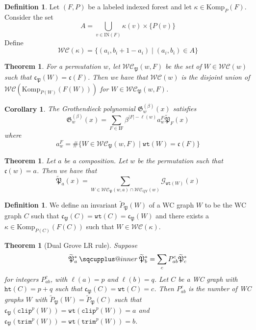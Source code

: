 \documentclass{amsart}
\makeatletter
\newcommand{\sqcupplus@inner}[2]{%
  \vcenter{\hbox{\ooalign{%
    \hfil$\m@th#1\sqcup$\hfil\cr
    \hfil\raisebox{0.15ex}{$\m@th#1\scriptscriptstyle+$}\hfil\cr
  }}}%
}
\newcommand{\sqcupplus}{\mathbin{\mathpalette\sqcupplus@inner\relax}}
\newtheorem{corollary}[lemma]{Corollary}
\newtheorem{theorem}[lemma]{Theorem}
\newcommand{\grove}{\widetilde{\mathfrak{P}}}
\theoremstyle{definition}
\newtheorem{definition}[lemma]{Definition}
\theoremstyle{remark}
\numberwithin{equation}{subsection}
\newcommand{\wtt}{\mathtt{wt}}
\newcommand{\trm}{\mathtt{trim}}
\newcommand{\hr}{\mathtt{ht}}
\newcommand{\clp}{\mathtt{clip}}
\newcommand{\WC}{\mathcal{WC}}
\newcommand{\code}{\mathfrak{c}}
\newcommand{\forest}{\mathfrak{P}}
\makeatother
\begin{document}
\begin{definition}
Let $(F,P)$ be a labeled indexed forest and let $\kappa\in\mathrm{Komp}_P(F)$. Consider the set 
$$A =\bigcup_{v\in\mathrm{IN}(F)}\kappa(v)\times \{P(v)\}$$
Define
$$\WC(\kappa) = \{(a_i, b_i + 1 - a_i)\mid (a_i, b_i)\in A\}$$
\end{definition}

\begin{theorem}
For a permutation $w$, let $\WC_\forest(w, F)$ be the set of $W\in\WC(w)$ such that $\code_\forest(W) = \code(F)$. Then we have that $\WC(w)$ is the disjoint union of $\WC(\mathrm{Komp}_{P(W)}(F(W)))$ for $W\in \WC_\forest(w, F)$.
\end{theorem}

\begin{corollary}
The Grothendieck polynomial $\mathfrak{G}^{(\beta)}_w(x)$ satisfies
$$\mathfrak{G}^{(\beta)}_w(x)=\sum_{F\in \mathrm{IF}} \beta^{|F|-\ell(w)}a_w^F\grove_F(x)$$
where 
$$a_w^F = \#\{W\in \WC_\forest(w, F)\mid \wtt(W) = \code(F)\}$$
\end{corollary}

\begin{theorem}
Let $a$ be a composition. Let $w$ be the permutation such that $\code(w) = a$. Then we have that
$$\grove_a(x) = \sum_{W\in\WC_\forest(w, a)\cap \WC_{\mathrm{QY}}(w)} \mathcal{G}_{\wtt(W)}(x)$$
\end{theorem}

\begin{definition}
We define an invariant $\widetilde{P}_\forest(W)$ of a WC graph $W$ to be the WC graph $C$ such that $\code_\forest(C) = \wtt(C) = \code_\forest(W)$ and there exists a $\kappa\in \mathrm{Komp}_{P(C)}(F(C))$ such that $W\in \WC(\kappa)$.
\end{definition}

\begin{theorem}[Dual Grove LR rule]
Suppose
$$\grove_a^*\sqcupplus \grove_b^* = \sum_c P_{ab}^c\grove_c^*$$
for integers $P_{ab}^c$, with $\ell(a)=p$ and $\ell(b)=q$. Let $C$ be a WC graph with $\hr(C)=p+q$ such that $\code_\forest(C)=\wtt(C)=c$. Then $P_{ab}^c$ is the number of WC graphs $W$ with $\widetilde{P}_\forest(W) = \widetilde{P}_\forest(C)$ such that $\code_\forest(\clp^p(W)) = \wtt(\clp^p(W)) = a$ and $\code_\forest(\trm^p(W)) = \wtt(\trm^p(W)) = b$.
\end{theorem}
\end{document}
